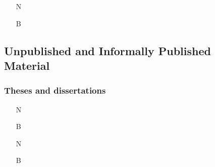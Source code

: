 \documentclass[11pt,letterpaper,oneside]{article}
\begin{document}
\begin{itemize}
\item[N] 

\item[B] 
\end{itemize}






\setcounter{subsection}{2}
\subsection{Unpublished and Informally Published Material}
\setcounter{subsection}{14}

\setcounter{subsubsection}{223}
\subsubsection{Theses and dissertations}

\begin{itemize}
\item[N] 

\item[B] 

\item[N] 

\item[B] 
\end{itemize}
\end{document}
